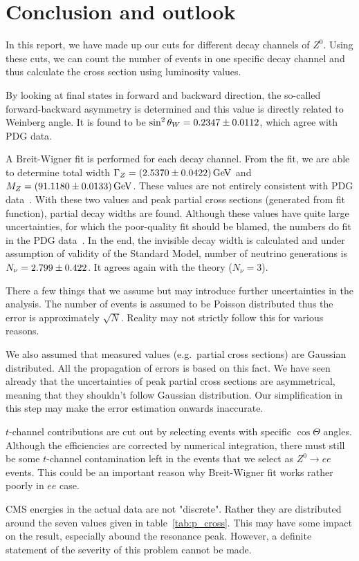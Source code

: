 \clearpage
\section{Conclusion and outlook}
In this report, we have made up our cuts for different decay channels of $Z^0$. Using these cuts, we can count the number of events in one specific decay channel and thus calculate the cross section using luminosity values. 

By looking at final states in forward and backward direction, the so-called forward-backward asymmetry is determined and this value is directly related to Weinberg angle. It is found to be $\sin^2\theta_W = \num{0.2347 +- 0.0112}$, which agree with PDG data.

A Breit-Wigner fit is performed for each decay channel. From the fit, we are able to determine total width $\Gamma_Z = \SI{2.537 +- 0.0422}{\giga\eV}$ and $M_Z = \SI{91.118 +- 0.0133}{\giga\eV}$. These values are not entirely consistent with PDG data~\cite{PDG}. With these two values and peak partial cross sections (generated from fit function), partial decay widths are found. Although these values have quite large uncertainties, for which the poor-quality fit should be blamed, the numbers do fit in the PDG data~\cite{PDG}. In the end, the invisible decay width is calculated and under assumption of validity of the Standard Model, number of neutrino generations is $N_{\nu} = \num{2.799 +- 0.422}$. It agrees again with the theory ($N_\nu = 3$).

There a few things that we assume but may introduce further uncertainties in the analysis. The number of events is assumed to be Poisson distributed thus the error is approximately $\sqrt{N}$. Reality may not strictly follow this for various reasons.

We also assumed that measured values (e.g.~partial cross sections) are Gaussian distributed. All the propagation of errors is based on this fact. We have seen already that the uncertainties of peak partial cross sections are asymmetrical, meaning that they shouldn't follow Gaussian distribution. Our simplification in this step may make the error estimation onwards inaccurate.

$t$-channel contributions are cut out by selecting events with specific $\cos\Theta$ angles. Although the efficiencies are corrected by numerical integration, there must still be some $t$-channel contamination left in the events that we select as $Z^0 \rightarrow ee$ events. This could be an important reason why Breit-Wigner fit works rather poorly in $ee$ case.

CMS energies in the actual data are not "discrete". Rather they are distributed around the seven values given in table~\ref{tab:p_cross}. This may have some impact on the result, especially abound the resonance peak. However, a definite statement of the severity of this problem cannot be made.

